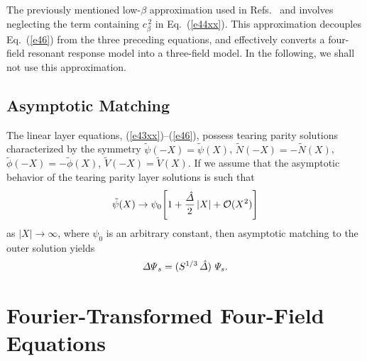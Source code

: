 \documentclass[12pt,prb,aps]{revtex4-1}
\begin{document}
The previously mentioned low-$\beta$ approximation used in Refs.~ and  involves neglecting the term
containing $c_\beta^{\,2}$ in Eq.~(\ref{e44xx}). This approximation decouples Eq.~(\ref{e46}) from the three preceding equations, and effectively
converts a four-field resonant response model into a three-field model. In the following, we shall not use this approximation.

\subsection{Asymptotic Matching}
The  linear layer equations, (\ref{e43xx})--(\ref{e46}), possess tearing parity solutions
characterized by the symmetry $\tilde{\psi}(-X)=\tilde\psi(X)$, 
$\tilde{N}(-X)= - \tilde{N}(X)$, $\tilde{\phi}(-X)=-\tilde{\phi}(X)$,  $\tilde{V}(-X)=\tilde{V}(X)$. If we assume that
the asymptotic behavior of the tearing parity layer solutions is such that 
\begin{equation}\label{e47}
\tilde{\psi}(X)\rightarrow  \psi_0\!\left[1+ \frac{\hat{\mit\Delta}}{2}\,|X| + {\cal O}(X^2)\right]
\end{equation}
as $|X|\rightarrow\infty$, where $\psi_0$ is an arbitrary constant, then asymptotic matching to the outer solution yields
\begin{equation}\label{e48}
{\mit\Delta\Psi}_s= (S^{1/3}\,\hat{\mit\Delta})\,\,{\mit\Psi}_s.
\end{equation}

\section{Fourier-Transformed Four-Field Equations}\label{linear}
\end{document}
